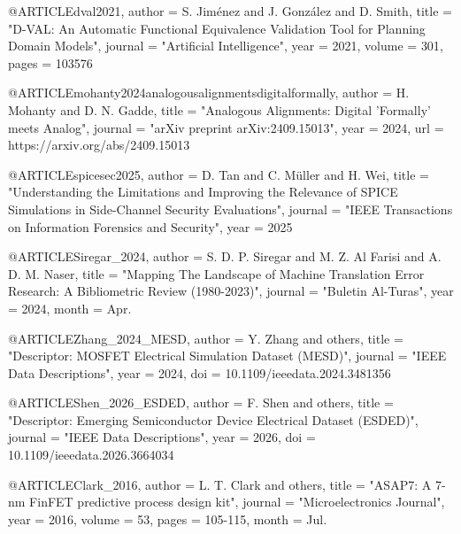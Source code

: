 \documentclass[conference]{IEEEtran}
\begin{document}
\begin{thebibliography}
@ARTICLE{dval2021,
    author      =   {S. {Jiménez} and J. {González} and D. {Smith}},
    title       =   "{D-VAL: An Automatic Functional Equivalence Validation Tool for Planning Domain Models}",
    journal     =   "{Artificial Intelligence}",
    year        =   {2021},
    volume      =   {301},
    pages       =   {103576}
}

@ARTICLE{mohanty2024analogousalignmentsdigitalformally,
    author      =   {H. {Mohanty} and D. N. {Gadde}},
    title       =   "{Analogous Alignments: Digital 'Formally' meets Analog}",
    journal     =   "{arXiv preprint arXiv:2409.15013}",
    year        =   {2024},
    url         =   {https://arxiv.org/abs/2409.15013}
}

@ARTICLE{spicesec2025,
    author      =   {D. {Tan} and C. {Müller} and H. {Wei}},
    title       =   "{Understanding the Limitations and Improving the Relevance of {SPICE} Simulations in Side-Channel Security Evaluations}",
    journal     =   "{IEEE Transactions on Information Forensics and Security}",
    year        =   {2025}
}

@ARTICLE{Siregar_2024,
    author      =   {S. D. P. {Siregar} and M. Z. {Al Farisi} and A. D. M. {Naser}},
    title       =   "{Mapping The Landscape of Machine Translation Error Research: A Bibliometric Review (1980-2023)}",
    journal     =   "{Buletin Al-Turas}",
    year        =   {2024},
    month       =   {Apr.}
}


@ARTICLE{Zhang_2024_MESD,
    author      =   {Y. {Zhang} and others},
    title       =   "{Descriptor: {MOSFET} Electrical Simulation Dataset ({MESD})}",
    journal     =   "{IEEE Data Descriptions}",
    year        =   {2024},
    doi         =   {10.1109/ieeedata.2024.3481356}
}

@ARTICLE{Shen_2026_ESDED,
    author      =   {F. {Shen} and others},
    title       =   "{Descriptor: Emerging Semiconductor Device Electrical Dataset ({ESDED})}",
    journal     =   "{IEEE Data Descriptions}",
    year        =   {2026},
    doi         =   {10.1109/ieeedata.2026.3664034}
}

@ARTICLE{Clark_2016,
    author      =   {L. T. {Clark} and others},
    title       =   "{ASAP7: A 7-nm FinFET predictive process design kit}",
    journal     =   "{Microelectronics Journal}",
    year        =   {2016},
    volume      =   {53},
    pages       =   {105-115},
    month       =   {Jul.}
}


\end{thebibliography}
\end{document}
